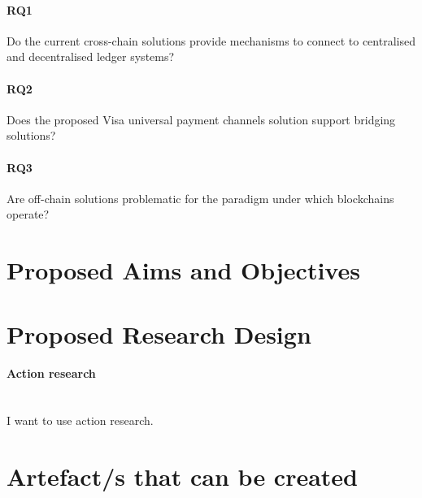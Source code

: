 \documentclass[12pt]{article}
\begin{document}
\paragraph{RQ1} Do the current cross-chain solutions provide mechanisms to connect to centralised and decentralised ledger systems?
\paragraph{RQ2} Does the proposed Visa universal payment channels solution support bridging solutions?
\paragraph{RQ3} Are off-chain solutions problematic for the paradigm under which blockchains operate?

\section{Proposed Aims and Objectives}

\section{Proposed Research Design}
\paragraph{Action research}\mbox{} \\
I want to use action research.

\section{Artefact/s that can be created}

\printbibliography
\end{document}
